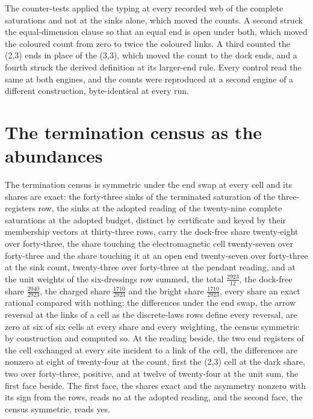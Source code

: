 \begin{chproof}[census]
The counter-tests applied the typing at every recorded web of the complete saturations and not at the sinks alone, which moved the counts. A second struck the equal-dimension clause so that an equal end is open under both, which moved the coloured count from zero to twice the coloured links. A third counted the (2,3) ends in place of the (3,3), which moved the count to the dock ends, and a fourth struck the derived definition at its larger-end rule. Every control read the same at both engines, and the counts were reproduced at a second engine of a different construction, byte-identical at every run.
\end{chproof}
\section{The termination census as the abundances}\label{mod:I-5-D543318-tcab-t1}
\begin{chtheorem}\label{box:I-5-D543318-tcab-t1:1}
The termination census is symmetric under the end swap at every cell and its shares are exact: the forty-three sinks of the terminated saturation of the three-registers row, the sinks at the adopted reading of the twenty-nine complete saturations at the adopted budget, distinct by certificate and keyed by their membership vectors at thirty-three rows, carry the dock-free share twenty-eight over forty-three, the share touching the electromagnetic cell twenty-seven over forty-three and the share touching it at an open end twenty-seven over forty-three at the sink count, twenty-three over forty-three at the pendant reading, and at the unit weights of the six-dressings row summed, the total $\tfrac{2923}{12}$, the dock-free share $\tfrac{2040}{2923}$, the charged share $\tfrac{1710}{2923}$ and the bright share $\tfrac{1710}{2923}$, every share an exact rational compared with nothing; the differences under the end swap, the arrow reversal at the links of a cell as the discrete-laws rows define every reversal, are zero at six of six cells at every share and every weighting, the census symmetric by construction and computed so. At the reading beside, the two end registers of the cell exchanged at every site incident to a link of the cell, the differences are nonzero at eight of twenty-four at the count, first the (2,3) cell at the dark share, two over forty-three, positive, and at twelve of twenty-four at the unit sum, the first face beside. The first face, the shares exact and the asymmetry nonzero with its sign from the rows, reads no at the adopted reading, and the second face, the census symmetric, reads yes.
\end{chtheorem}
